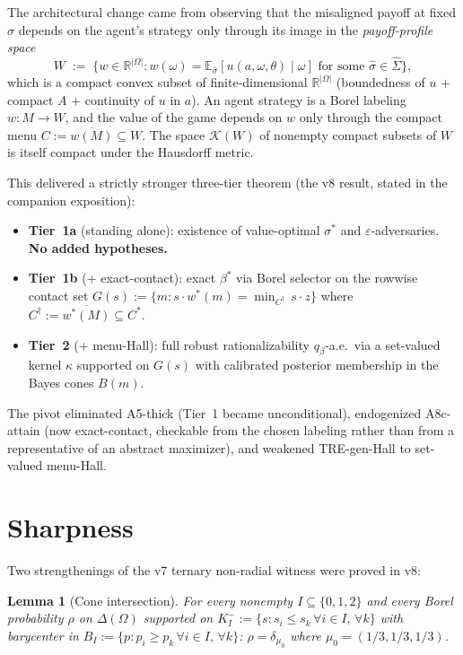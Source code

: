 \documentclass[11pt]{article}
\newtheorem{lemma}[theorem]{Lemma}
\theoremstyle{definition}
\theoremstyle{remark}
\newcommand{\R}{\mathbb{R}}
\newcommand{\eps}{\varepsilon}
\newcommand{\Om}{\Omega}
\newcommand{\Si}{\Sigma}
\newcommand{\E}{\mathbb{E}}
\begin{document}
The architectural change came from observing that the misaligned
payoff at fixed $\sigma$ depends on the agent's strategy only through
its image in the \emph{payoff-profile space}
\[
  W \;:=\; \{w\in\R^{|\Om|} : w(\omega) = \E_{\hat\sigma}[u(a,\omega,\theta)\mid\omega]\text{ for some }\hat\sigma\in\hat\Si\},
\]
which is a compact convex subset of finite-dimensional $\R^{|\Om|}$
(boundedness of $u$ + compact $A$ + continuity of $u$ in $a$). An
agent strategy is a Borel labeling $w: M\to W$, and the value of the
game depends on $w$ only through the compact menu $C := \overline{w(M)}\subseteq W$.
The space $\mathcal K(W)$ of nonempty compact subsets of $W$ is itself
compact under the Hausdorff metric.

This delivered a strictly stronger three-tier theorem (the v8 result,
stated in the companion exposition):
\begin{itemize}[leftmargin=2em]
\item \textbf{Tier~1a} (standing alone): existence of value-optimal
$\sigma^*$ and $\eps$-adversaries. \textbf{No added hypotheses.}
\item \textbf{Tier~1b} (+ exact-contact): exact $\beta^*$ via Borel
selector on the rowwise contact set $G(s) := \{m : s\cdot w^*(m) =
\min_{C^\dagger}\,s\cdot z\}$ where $C^\dagger := \overline{w^*(M)}\subseteq C^*$.
\item \textbf{Tier~2} (+ menu-Hall): full robust rationalizability
$q_\beta$-a.e.\ via a set-valued kernel $\kappa$ supported on $G(s)$
with calibrated posterior membership in the Bayes cones $B(m)$.
\end{itemize}

The pivot eliminated A5-thick (Tier~1 became unconditional),
endogenized A8c-attain (now exact-contact, checkable from the chosen
labeling rather than from a representative of an abstract maximizer),
and weakened TRE-gen-Hall to set-valued menu-Hall.

\section{Sharpness}\label{sec:sharpness}

Two strengthenings of the v7 ternary non-radial witness were proved
in v8:

\begin{lemma}[Cone intersection]
For every nonempty $I\subseteq\{0,1,2\}$ and every Borel probability
$\rho$ on $\Delta(\Om)$ supported on $K_I^- := \{s : s_i\le s_k\,\forall i\in I,\,\forall k\}$
with barycenter in $B_I := \{p : p_i\ge p_k\,\forall i\in I,\,\forall k\}$:
$\rho = \delta_{\mu_0}$ where $\mu_0 = (1/3, 1/3, 1/3)$.
\end{lemma}
\end{document}
